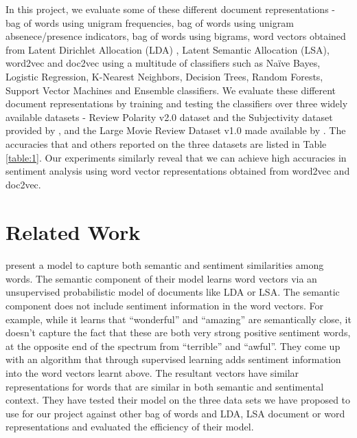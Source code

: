 \documentclass[a4paper,26pt]{article}
\begin{document}
In this project, we evaluate some of these different document representations - bag of words using unigram frequencies, bag of words using unigram absenece/presence indicators, bag of words using bigrams, word vectors obtained from Latent Dirichlet Allocation (LDA) \cite{blei2003latent}, Latent Semantic Allocation (LSA), word2vec \cite{le2014distributed} and doc2vec using a multitude of classifiers such as Naïve Bayes, Logistic Regression, K-Nearest Neighbors, Decision Trees, Random Forests, Support Vector Machines and Ensemble classifiers. We evaluate these different document representations by training and testing the classifiers over three widely available datasets - Review Polarity v2.0 dataset and the Subjectivity dataset provided by \cite{pang2004sentimental}, and the Large Movie Review Dataset v1.0 made available by \cite{maas2011learning}. The accuracies that \cite{maas2011learning} and others \cite{sadeghianbag} reported on the three datasets are listed in Table \ref{table:1}. Our experiments similarly reveal that we can achieve high accuracies in sentiment analysis using word vector representations obtained from word2vec and doc2vec. 

\section{Related Work}

\paragraph{}
\cite{maas2011learning} present a model to capture both semantic and sentiment similarities among words.
The semantic component of their model learns word vectors via an unsupervised probabilistic model of documents like LDA or LSA. The semantic component does not include sentiment information in the word vectors. For example, while it learns that ``wonderful'' and ``amazing'' are semantically close, it doesn't capture the fact that these are both very strong positive
sentiment words, at the opposite end of the spectrum from ``terrible'' and ``awful''. They come up with an algorithm that through supervised learning adds sentiment information into the word vectors learnt above. The resultant vectors have similar representations for words that are similar in both semantic and sentimental context. They have tested their model on the three data sets we have proposed to use for our project against other bag of words and LDA, LSA document or word representations and evaluated the efficiency of their model. 
\end{document}
